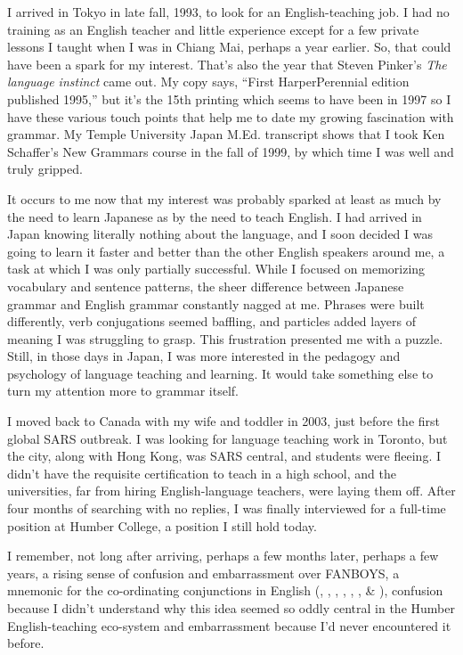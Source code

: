 \bigskip

I arrived in Tokyo in late fall, 1993, to look for an English-teaching job. I had no training as an English teacher and little experience except for a few private lessons I taught when I was in Chiang Mai, perhaps a year earlier. So, that could have been a spark for my interest. %
That's also the year that Steven Pinker's \textit{The language instinct} came out. My copy says, \enquote{First HarperPerennial edition published 1995,} but it's the 15th printing which seems to have been in 1997 so I have these various touch points that help me to date my growing fascination with grammar. My Temple University Japan M.Ed. transcript shows that I took Ken Schaffer's New Grammars course in the fall of 1999, by which time I was well and truly gripped.

It occurs to me now that my interest was probably sparked at least as much by the need to learn Japanese as by the need to teach English. I had arrived in Japan knowing literally nothing about the language, and I soon decided I was going to learn it faster and better than the other English speakers around me, a task at which I was only partially successful. While I focused on memorizing vocabulary and sentence patterns, the sheer difference between Japanese grammar and English grammar constantly nagged at me. Phrases were built differently, verb conjugations seemed baffling, and particles added layers of meaning I was struggling to grasp. This frustration presented me with a puzzle. Still, in those days in Japan, I was more interested in the pedagogy and psychology of language teaching and learning. It would take something else to turn my attention more to grammar itself.

\bigskip

I moved back to Canada with my wife and toddler in 2003, just before the first global SARS outbreak. I was looking for language teaching work in Toronto, but the city, along with Hong Kong, was SARS central, and students were fleeing. I didn't have the requisite certification to teach in a high school, and the universities, far from hiring English-language teachers, were laying them off. After four months of searching with no replies, I was finally interviewed for a full-time position at Humber College, a position I still hold today.

I remember, not long after arriving, perhaps a few months later, perhaps a few years, a rising sense of confusion and embarrassment over FANBOYS, a mnemonic for the co-ordinating conjunctions in English (, , , , , , \& ), confusion because I didn't understand why this idea seemed so oddly central in the Humber English-teaching eco-system and embarrassment because I'd never encountered it before.

